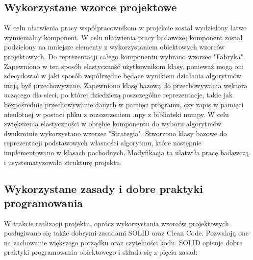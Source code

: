 \documentclass[oneside, eng]{mgr}
\begin{document}
\subsection{Wykorzystane wzorce projektowe}

W celu ułatwienia pracy współpracownikom w projekcie został wydzielony łatwo wymienialny komponent. W celu ułatwienia pracy badawczej komponent został podzielony na mniejsze elementy z wykorzystaniem obiektowych wzorców projektowych.
Do reprezentacji całego komponentu wybrano wzorzec "Fabryka". Zapewniono w ten sposób elastyczność użytkownikom klasy, ponieważ mogą oni zdecydować w jaki sposób współrzędne będące wynikiem działania algorytmów mają być przechowywane. Zapewniono klasę bazową do przechowywania wektora uczącego dla sieci, po której dziedziczą poszczególne reprezentacje, takie jak bezpośrednie przechowywanie danych w pamięci programu, czy zapis w pamięci nieulotnej w postaci pliku z rozszerzeniem .npy z biblioteki numpy.
W celu zwiększenia elastyczności w obrębie komponentu do wyboru algorytmów dwukrotnie wykorzystano wzorzec "Strategia". Stworzono klasy bazowe do reprezentacji podstawowych własności algorytmu, które następnie implementowano w klasach pochodnych. Modyfikacja ta ułatwiła pracę badawczą i usystematyzowała strukturę projektu.

\subsection{Wykorzystane zasady i dobre praktyki programowania}

W trakcie realizacji projektu, oprócz wykorzystania wzorców projektowych posługiwano się także dobrymi zasadami SOLID oraz Clean Code. Pozwalają one na zachowanie większego porządku oraz czytelności kodu. SOLID opisuje dobre praktyki programowania obiektowego i składa się z pięciu zasad:
\end{document}
